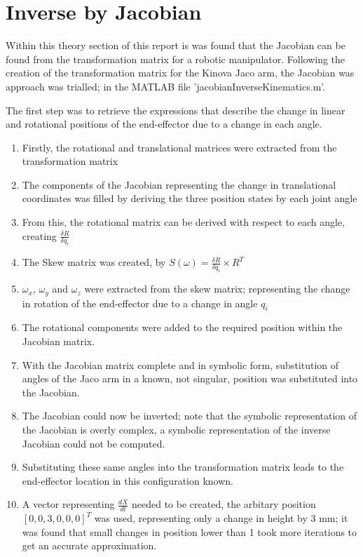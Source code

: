 \documentclass[12pt,openany,a4paper]{book}
\begin{document}
\section{Inverse by Jacobian}
Within this theory section of this report is was found that the Jacobian can be found from the transformation matrix for a robotic manipulator. Following the creation of the transformation matrix for the Kinova Jaco arm, the Jacobian was approach was trialled; in the MATLAB file 'jacobianInverseKinematics.m'.

The first step was to retrieve the expressions that describe the change in linear and rotational positions of the end-effector due to a change in each angle. 

\begin{enumerate}
  \item Firstly, the rotational and translational matrices were extracted from the transformation matrix
  \item The components of the Jacobian representing the change in translational coordinates was filled by deriving the three position states by each joint angle
  \item From this, the rotational matrix can be derived with respect to each angle, creating $\frac{\delta R}{\delta q_i}$
  \item The Skew matrix was created, by $S(\omega) = \frac{\delta R}{\delta q_i} \times R^T$
  \item $\omega_x$, $\omega_y$ and $\omega_z$ were extracted from the skew matrix; representing the change in rotation of the end-effector due to a change in angle $q_i$ 
  \item The rotational components were added to the required position within the Jacobian matrix.
  \item With the Jacobian matrix complete and in symbolic form, substitution of angles of the Jaco arm in a known, not singular, position was substituted into the Jacobian.
  \item The Jacobian could now be inverted; note that the symbolic representation of the Jacobian is overly complex, a symbolic representation of the inverse Jacobian could not be computed.
  \item Substituting these same angles into the transformation matrix leads to the end-effector location in this configuration known.
  \item A vector representing $\frac{dX}{dt}$ needed to be created, the arbitary position $[0, 0, 3, 0, 0, 0]^T$ was used, representing only a change in height by 3 mm; it was found that small changes in position lower than 1 took more iterations to get an accurate approximation.

\end{enumerate}
\end{document}
